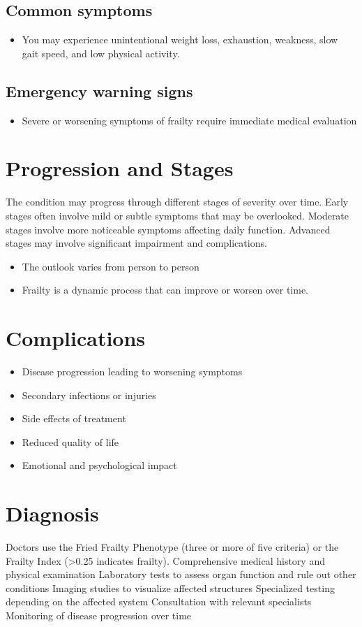 \subsection{Common symptoms}
\begin{itemize}[noitemsep]
  \item You may experience unintentional weight loss, exhaustion, weakness, slow gait speed, and low physical activity. 
  \end{itemize}

\subsection{Emergency warning signs}
\begin{itemize}[noitemsep]
  \item Severe or worsening symptoms of frailty require immediate medical evaluation
\end{itemize}
\section{Progression and Stages}
The condition may progress through different stages of severity over time. Early stages often involve mild or subtle symptoms that may be overlooked. Moderate stages involve more noticeable symptoms affecting daily function. Advanced stages may involve significant impairment and complications.

\begin{itemize}[noitemsep]
  \item The outlook varies from person to person
  \item Frailty is a dynamic process that can improve or worsen over time.
\end{itemize}
\section{Complications}
\begin{itemize}[noitemsep]
  \item Disease progression leading to worsening symptoms
  \item Secondary infections or injuries
  \item Side effects of treatment
  \item Reduced quality of life
  \item Emotional and psychological impact
\end{itemize}
\section{Diagnosis}
Doctors use the Fried Frailty Phenotype (three or more of five criteria) or the Frailty Index (>0.25 indicates frailty). Comprehensive medical history and physical examination Laboratory tests to assess organ function and rule out other conditions Imaging studies to visualize affected structures Specialized testing depending on the affected system Consultation with relevant specialists Monitoring of disease progression over time

